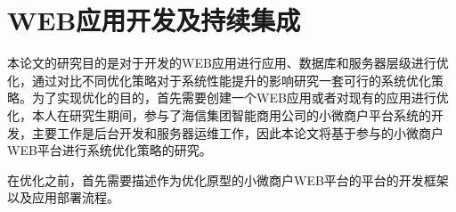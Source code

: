 \chapter{WEB应用开发及持续集成}
\label{cha:web}
本论文的研究目的是对于开发的WEB应用进行应用、数据库和服务器层级进行优化，通过对比不同优化策略对于系统性能提升的影响研究一套可行的系统优化策略。为了实现优化的目的，首先需要创建一个WEB应用或者对现有的应用进行优化，本人在研究生期间，参与了海信集团智能商用公司的小微商户平台系统的开发，主要工作是后台开发和服务器运维工作，因此本论文将基于参与的小微商户WEB平台进行系统优化策略的研究。

在优化之前，首先需要描述作为优化原型的小微商户WEB平台的平台的开发框架以及应用部署流程。


